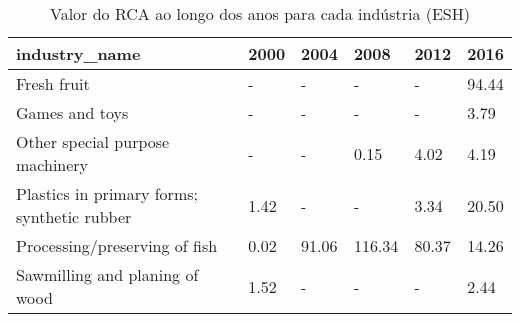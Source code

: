 \begin{table}
\centering
\caption{Valor do RCA ao longo dos anos para cada indústria (ESH)}
\begin{tabular}{p{6cm}p{1.5cm}p{1.5cm}p{1.5cm}p{1.5cm}p{1.5cm}}
\toprule
                              industry\_name & 2000 &  2004 &   2008 &  2012 &  2016 \\
\midrule
                                Fresh fruit &    - &     - &      - &     - & 94.44 \\
                             Games and toys &    - &     - &      - &     - &  3.79 \\
            Other special purpose machinery &    - &     - &   0.15 &  4.02 &  4.19 \\
Plastics in primary forms; synthetic rubber & 1.42 &     - &      - &  3.34 & 20.50 \\
              Processing/preserving of fish & 0.02 & 91.06 & 116.34 & 80.37 & 14.26 \\
             Sawmilling and planing of wood & 1.52 &     - &      - &     - &  2.44 \\
\bottomrule
\end{tabular}
\end{table}
